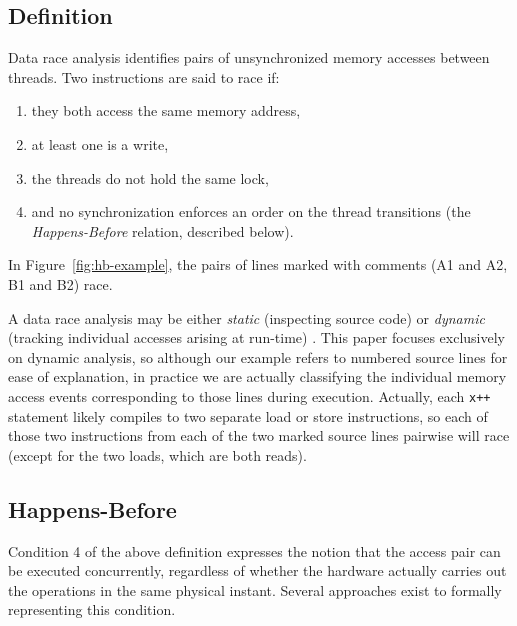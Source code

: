 \subsection{Definition}

Data race analysis \cite{eraser} identifies pairs of unsynchronized memory accesses between threads.
Two instructions are said to race if:
\begin{enumerate}
	\item they both access the same memory address,
	\item at least one is a write,
	\item the threads do not hold the same lock,
	\item and no synchronization enforces an order on the thread transitions (the {\em Happens-Before} relation, described below).
\end{enumerate}
In Figure~\ref{fig:hb-example}, the pairs of lines marked with comments (A1 and A2, B1 and B2) race.

A data race analysis may be either {\em static} (inspecting source code) \cite{racerx} or {\em dynamic} (tracking individual accesses arising at run-time) \cite{tsan}.
This paper focuses exclusively on dynamic analysis,
so although our example refers to numbered source lines for ease of explanation,
in practice we are actually classifying the individual memory access events corresponding to those lines during execution.
Actually, each {\tt x++} statement likely compiles to two separate load or store instructions, so each of those two instructions from each of the two marked source lines pairwise will race (except for the two loads, which are both reads).

\subsection{Happens-Before}
\label{sec:background-hb}

Condition 4 of the above definition expresses the notion that the access pair can be executed concurrently,
regardless of whether the hardware actually carries out the operations in the same physical instant.
Several approaches exist to formally representing this condition.

